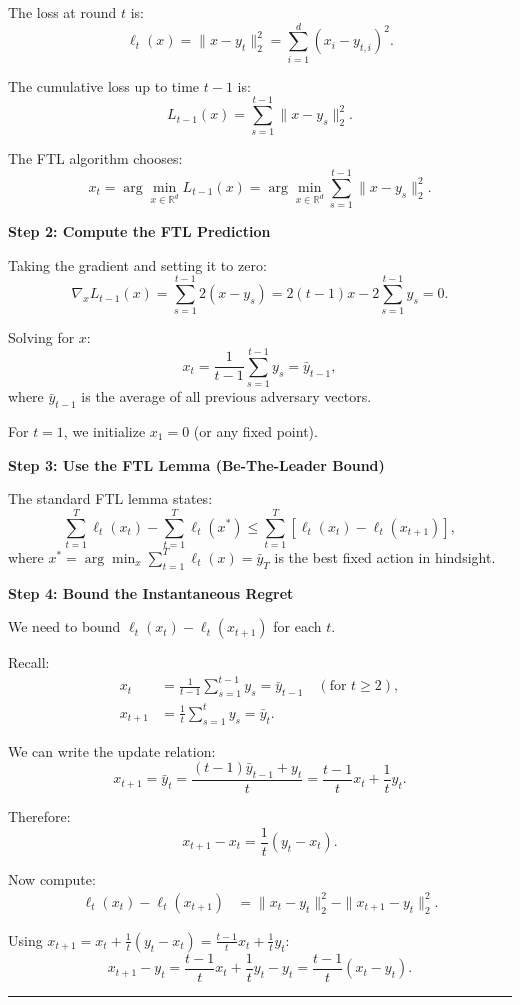 \documentclass[12pt,letterpaper]{article}
\newenvironment{proof}{\noindent{\bf Proof:}}{\qed\bigskip}
\newcommand{\qed}{\rule{7pt}{7pt}}
\begin{document}
\begin{enumerate}
\begin{proof}
The loss at round $t$ is:
\[
\ell_t(x) = \|x - y_t\|_2^2 = \sum_{i=1}^{d}(x_i - y_{t,i})^2.
\]

The cumulative loss up to time $t-1$ is:
\[
L_{t-1}(x) = \sum_{s=1}^{t-1}\|x - y_s\|_2^2.
\]

The FTL algorithm chooses:
\[
x_t = \arg\min_{x \in \mathbb{R}^d} L_{t-1}(x) = \arg\min_{x \in \mathbb{R}^d} \sum_{s=1}^{t-1}\|x - y_s\|_2^2.
\]

\bigskip

\textbf{Step 2: Compute the FTL Prediction}

Taking the gradient and setting it to zero:
\[
\nabla_x L_{t-1}(x) = \sum_{s=1}^{t-1} 2(x - y_s) = 2(t-1)x - 2\sum_{s=1}^{t-1}y_s = 0.
\]

Solving for $x$:
\[
x_t = \frac{1}{t-1}\sum_{s=1}^{t-1}y_s = \bar{y}_{t-1},
\]
where $\bar{y}_{t-1}$ is the average of all previous adversary vectors.

For $t = 1$, we initialize $x_1 = 0$ (or any fixed point).

\bigskip

\textbf{Step 3: Use the FTL Lemma (Be-The-Leader Bound)}

The standard FTL lemma states:
\[
\sum_{t=1}^{T}\ell_t(x_t) - \sum_{t=1}^{T}\ell_t(x^*) \leq \sum_{t=1}^{T}\left[\ell_t(x_t) - \ell_t(x_{t+1})\right],
\]
where $x^* = \arg\min_x \sum_{t=1}^{T}\ell_t(x) = \bar{y}_T$ is the best fixed action in hindsight.

\bigskip

\textbf{Step 4: Bound the Instantaneous Regret}

We need to bound $\ell_t(x_t) - \ell_t(x_{t+1})$ for each $t$.

Recall:
\begin{align*}
x_t &= \frac{1}{t-1}\sum_{s=1}^{t-1}y_s = \bar{y}_{t-1} \quad (\text{for } t \geq 2), \\
x_{t+1} &= \frac{1}{t}\sum_{s=1}^{t}y_s = \bar{y}_t.
\end{align*}

We can write the update relation:
\[
x_{t+1} = \bar{y}_t = \frac{(t-1)\bar{y}_{t-1} + y_t}{t} = \frac{t-1}{t}x_t + \frac{1}{t}y_t.
\]

Therefore:
\[
x_{t+1} - x_t = \frac{1}{t}(y_t - x_t).
\]

Now compute:
\begin{align*}
\ell_t(x_t) - \ell_t(x_{t+1}) &= \|x_t - y_t\|_2^2 - \|x_{t+1} - y_t\|_2^2.
\end{align*}

Using $x_{t+1} = x_t + \frac{1}{t}(y_t - x_t) = \frac{t-1}{t}x_t + \frac{1}{t}y_t$:
\[
x_{t+1} - y_t = \frac{t-1}{t}x_t + \frac{1}{t}y_t - y_t = \frac{t-1}{t}(x_t - y_t).
\]


\end{proof}
\end{enumerate}
\end{document}

